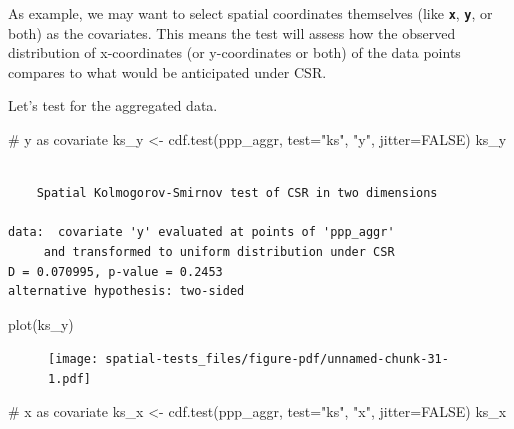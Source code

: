 \documentclass[
  letterpaper,
]{book}
\newenvironment{Shaded}{\begin{snugshade}}{\end{snugshade}}
\newcommand{\AttributeTok}[1]{\textcolor[rgb]{0.40,0.45,0.13}{#1}}
\newcommand{\CommentTok}[1]{\textcolor[rgb]{0.37,0.37,0.37}{#1}}
\newcommand{\ConstantTok}[1]{\textcolor[rgb]{0.56,0.35,0.01}{#1}}
\newcommand{\FunctionTok}[1]{\textcolor[rgb]{0.28,0.35,0.67}{#1}}
\newcommand{\NormalTok}[1]{\textcolor[rgb]{0.00,0.23,0.31}{#1}}
\newcommand{\OtherTok}[1]{\textcolor[rgb]{0.00,0.23,0.31}{#1}}
\newcommand{\StringTok}[1]{\textcolor[rgb]{0.13,0.47,0.30}{#1}}
\begin{document}
As example, we may want to select spatial coordinates themselves (like
\textbf{\texttt{x}}, \textbf{\texttt{y}}, or both) as the covariates.
This means the test will assess how the observed distribution of
x-coordinates (or y-coordinates or both) of the data points compares to
what would be anticipated under CSR.

Let's test for the aggregated data.

\begin{Shaded}
\begin{Highlighting}[]
\CommentTok{\# y as covariate}
\NormalTok{ks\_y }\OtherTok{\textless{}{-}} \FunctionTok{cdf.test}\NormalTok{(ppp\_aggr, }\AttributeTok{test=}\StringTok{"ks"}\NormalTok{, }\StringTok{"y"}\NormalTok{, }\AttributeTok{jitter=}\ConstantTok{FALSE}\NormalTok{)}
\NormalTok{ks\_y}
\end{Highlighting}
\end{Shaded}

\begin{verbatim}

    Spatial Kolmogorov-Smirnov test of CSR in two dimensions

data:  covariate 'y' evaluated at points of 'ppp_aggr' 
     and transformed to uniform distribution under CSR
D = 0.070995, p-value = 0.2453
alternative hypothesis: two-sided
\end{verbatim}

\begin{Shaded}
\begin{Highlighting}[]
\FunctionTok{plot}\NormalTok{(ks\_y)}
\end{Highlighting}
\end{Shaded}

\begin{figure}[H]

{\centering \texttt{[image: spatial-tests\_files/figure-pdf/unnamed-chunk-31-1.pdf]}

}

\end{figure}

\begin{Shaded}
\begin{Highlighting}[]
\CommentTok{\# x as covariate}
\NormalTok{ks\_x }\OtherTok{\textless{}{-}} \FunctionTok{cdf.test}\NormalTok{(ppp\_aggr, }\AttributeTok{test=}\StringTok{"ks"}\NormalTok{, }\StringTok{"x"}\NormalTok{, }\AttributeTok{jitter=}\ConstantTok{FALSE}\NormalTok{)}
\NormalTok{ks\_x}
\end{Highlighting}
\end{Shaded}
\end{document}
